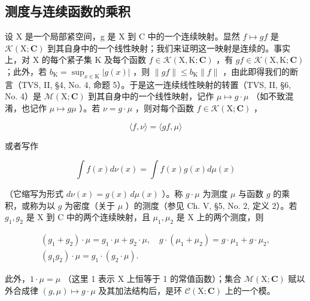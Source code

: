 \subsection{测度与连续函数的乘积}

设 X 是一个局部紧空间，g 是 X 到 C 中的一个连续映射。显然 \(f \mapsto gf\) 是 \(\mathcal{K}(\mathrm{X};\mathbf{C})\) 到其自身中的一个线性映射；我们来证明这一映射是连续的。事实上，对 X 的每个紧子集 K 及每个函数 \(f \in \mathcal{K}(\mathrm{X},\mathrm{K};\mathbf{C})\) ，有 \(gf \in \mathcal{K}(\mathrm{X},\mathrm{K};\mathbf{C})\) ；此外，若 \(b_{\mathrm{K}} = \sup_{x \in \mathrm{K}} |g(x)|\) ，则 \(\|gf\| \leqslant b_{\mathrm{K}} \|f\|\) ，由此即得我们的断言（TVS, II, §4, No. 4, 命题 5）。于是这一连续线性映射的转置（TVS, II, §6, No. 4）是 \(\mathcal{M}(\mathrm{X};\mathbf{C})\) 到其自身中的一个线性映射，记作 \(\mu \mapsto g \cdot \mu\) （如不致混淆，也记作 \(\mu \mapsto g\mu\) ）。若 \(\nu = g \cdot \mu\) ，则对每个函数 \(f \in \mathcal{K}(\mathrm{X};\mathbf{C})\) ，

\[
\langle f, \nu \rangle = \langle g f, \mu \rangle\tag{6}
\]

或者写作

\[
\int f (x) d \nu (x) = \int f (x) g (x) d \mu (x)
\]

（它缩写为形式 \(d\nu(x) = g(x) \, d\mu(x)\) ）。称 \(g \cdot \mu\) 为测度 \(\mu\) 与函数 \(g\) 的乘积，或称为以 \(g\) 为密度（关于 \(\mu\) ）的测度（参见 Ch. V, §5, No. 2, 定义 2）。若 \(g_1, g_2\) 是 X 到 C 中的两个连续映射，且 \(\mu_1, \mu_2\) 是 X 上的两个测度，则

\[
\begin{array}{c} (g _ {1} + g _ {2}) \cdot \mu = g _ {1} \cdot \mu + g _ {2} \cdot \mu , \quad g \cdot (\mu_ {1} + \mu_ {2}) = g \cdot \mu_ {1} + g \cdot \mu_ {2}, \\ (g _ {1} g _ {2}) \cdot \mu = g _ {1} \cdot (g _ {2} \cdot \mu). \end{array}
\]

此外，\(1 \cdot \mu = \mu\) （这里 1 表示 X 上恒等于 1 的常值函数）；集合 \(\mathcal{M}(\mathrm{X};\mathbf{C})\) 赋以外合成律 \((g,\mu) \mapsto g \cdot \mu\) 及其加法结构后，是环 \(\mathcal{C}(\mathrm{X};\mathbf{C})\) 上的一个模。

